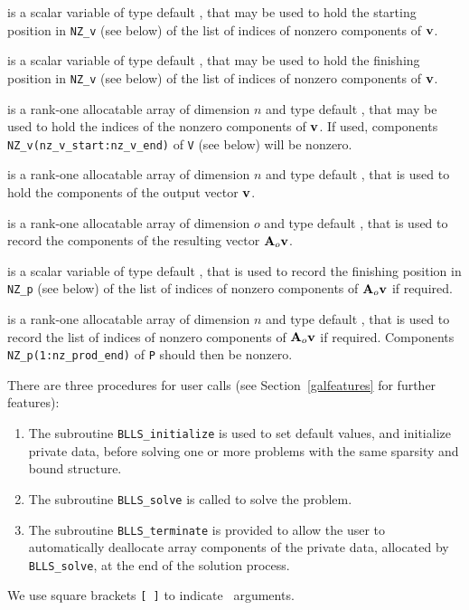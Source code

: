 \documentclass{galahad}
\newcommand{\packagename}{BLLS}
\begin{document}
\begin{description}

 is a scalar variable of type default \integer, that
may be used to hold the starting position in {\tt NZ\_v} (see below)
of the list of indices of nonzero components of ${\mathbf{v}}$.

 is a scalar variable of type default \integer, that
may be used to hold the finishing position in {\tt NZ\_v} (see below)
of the list of indices of nonzero components of ${\mathbf{v}}$.

 is a rank-one allocatable array of dimension $n$
and type default \integer, that may be used to hold the indices of the
nonzero components of ${\mathbf{v}}$. If used, components
{\tt NZ\_v(nz\_v\_start:nz\_v\_end)} of {\tt V} (see below) will be nonzero.

 is a rank-one allocatable array of dimension $n$
and type default \realdp, that is used to hold the components of the
output vector ${\mathbf{v}}$.

 is a rank-one allocatable array of dimension $o$
and type default \realdp, that is used to record the components of the
resulting vector ${\mathbf{A}}_o {\mathbf{v}}$.

 is a scalar variable of type default \integer, that
is used to record the finishing position in {\tt NZ\_p} (see below)
of the list of indices of nonzero components of ${\mathbf{A}}_o {\mathbf{v}}$ if required.

 is a rank-one allocatable array of dimension $n$
and type default \integer, that is used to record the list of
indices of nonzero components of ${\mathbf{A}}_o {\mathbf{v}}$ if required. Components
{\tt NZ\_p(1:nz\_prod\_end)} of {\tt P} should then be nonzero.

\end{description}


\galarguments
There are three procedures for user calls
(see Section~\ref{galfeatures} for further features):

\begin{enumerate}
\item The subroutine
      {\tt \packagename\_initialize}
      is used to set default values, and initialize private data,
      before solving one or more problems with the
      same sparsity and bound structure.
\item The subroutine
      {\tt \packagename\_solve}
      is called to solve the problem.
\item The subroutine
      {\tt \packagename\_terminate}
      is provided to allow the user to automatically deallocate array
       components of the private data, allocated by
       {\tt \packagename\_solve},
       at the end of the solution process.
\end{enumerate}
We use square brackets {\tt [ ]} to indicate \optional\ arguments.
\end{document}
